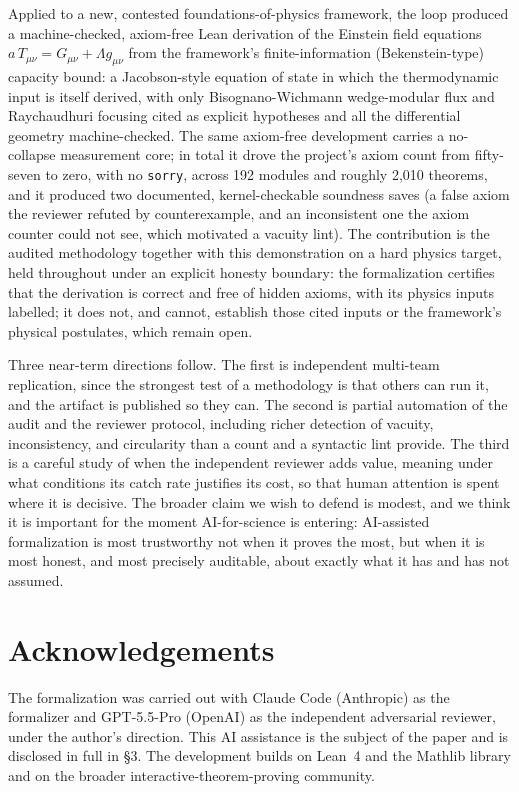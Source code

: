 \documentclass[11pt]{article}
\begin{document}
Applied to a new, contested foundations-of-physics framework, the loop produced a machine-checked,
axiom-free Lean derivation of the Einstein field equations $a\,T_{\mu\nu}=G_{\mu\nu}+\Lambda g_{\mu\nu}$
from the framework's finite-information (Bekenstein-type) capacity bound: a Jacobson-style equation of
state in which the thermodynamic input is itself derived, with only Bisognano-Wichmann wedge-modular
flux and Raychaudhuri focusing cited as explicit hypotheses and all the differential geometry
machine-checked. The same axiom-free development carries a no-collapse measurement core; in total it
drove the project's axiom count from fifty-seven to zero, with no \texttt{sorry}, across 192 modules
and roughly 2{,}010 theorems, and it produced two documented, kernel-checkable soundness saves (a false
axiom the reviewer refuted by counterexample, and an inconsistent one the axiom counter could not see,
which motivated a vacuity lint). The contribution is the audited methodology together with this
demonstration on a hard physics target, held throughout under an explicit honesty boundary: the
formalization certifies that the derivation is correct and free of hidden axioms, with its physics
inputs labelled; it does not, and cannot, establish those cited inputs or the framework's physical
postulates, which remain open.

Three near-term directions follow. The first is independent multi-team replication, since the strongest
test of a methodology is that others can run it, and the artifact is published so they can. The second
is partial automation of the audit and the reviewer protocol, including richer detection of vacuity,
inconsistency, and circularity than a count and a syntactic lint provide. The third is a careful study
of when the independent reviewer adds value, meaning under what conditions its catch rate justifies its
cost, so that human attention is spent where it is decisive. The broader claim we wish to defend is
modest, and we think it is important for the moment AI-for-science is entering: AI-assisted
formalization is most trustworthy not when it proves the most, but when it is most honest, and most
precisely auditable, about exactly what it has and has not assumed.

\section*{Acknowledgements}

The formalization was carried out with Claude Code (Anthropic) as the formalizer and GPT-5.5-Pro
(OpenAI) as the independent adversarial reviewer, under the author's direction. This AI assistance is
the subject of the paper and is disclosed in full in \S3. The development builds on Lean~4 and the
Mathlib library and on the broader interactive-theorem-proving community.
\end{document}
